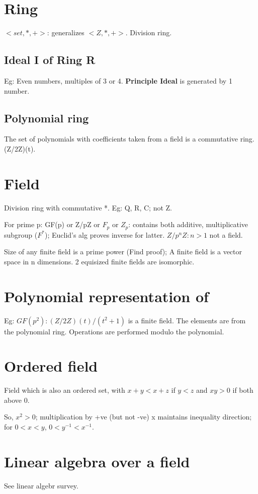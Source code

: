 \documentclass[oneside, article]{memoir}
\begin{document}
\section{Ring}
$<set, *, +>$: generalizes $<Z, *, +>$. Division ring.

\subsection{Ideal I of Ring R}
Eg: Even numbers, multiples of 3 or 4. \textbf{Principle Ideal} is generated by 1 number.

\subsection{Polynomial ring}
The set of polynomials with coefficients taken from a field is  a commutative ring. (Z/2Z)(t).

\section{Field}
Division ring with commutative *. Eg: Q, R, C; not Z.

For prime p: GF(p) or Z/pZ or $F_{p}$ or $Z_{p}$: contains both additive, multiplicative subgroup ($F^{*}$); Euclid's alg proves inverse for latter. $Z/p^{n}Z : n>1$ not a field.

Size of any finite field is a prime power (Find proof); A finite field is a vector space in n dimensions. 2 equisized finite fields are isomorphic.

\section{Polynomial representation of }
Eg: $GF(p^{2}): (Z/2Z)(t)/ (t^{2}+1)$ is a finite field. The elements are from the polynomial ring. Operations are performed modulo the polynomial.

\section{Ordered field}
Field which is also an ordered set, with $x+y < x+z$ if $y<z$ and $xy>0$ if both above 0.

So, $x^{2}>0$; multiplication by +ve (but not -ve) x maintains inequality direction; for $0<x<y$, $0<y^{-1}<x^{-1}$.

\section{Linear algebra over a field}
See linear algebr survey.

%
%
\end{document}
